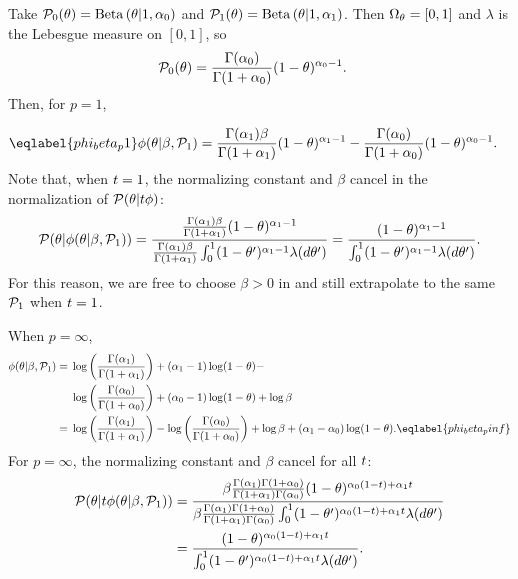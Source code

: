 \begin{ex}
%
Take $\mathcal{P}_{0}(\theta) = \mathrm{Beta}\left(\theta \vert 1, \alpha_0\right)$ and
$\mathcal{P}_{1}(\theta) = \mathrm{Beta}\left(\theta \vert 1, \alpha_1\right)$.  Then
$\Omega_{\theta}=[0,1]$ and $\lambda$ is the Lebesgue measure on $[0,1]$, so
%
\begin{align*}
%
\pbase(\theta) ={}&
    \frac{\Gamma(\alpha_0)}{\Gamma(1 + \alpha_0)} (1 - \theta)^{\alpha_0 - 1}.
%
\end{align*}
%
Then, for $p = 1$,

\begin{align}\eqlabel{phi_beta_p1}
%
\phi(\theta \vert \beta, \palt) ={}&
    \frac{\Gamma(\alpha_1)\beta}{\Gamma(1 + \alpha_1)} (1 - \theta)^{\alpha_1 - 1} -
    \frac{\Gamma(\alpha_0)}{\Gamma(1 + \alpha_0)}
        (1 - \theta)^{\alpha_0 - 1}.
%
\end{align}
%
Note that, when $t = 1$, the normalizing constant and $\beta$ cancel in the
normalization of $\mathcal{P}(\theta \vert t \phi)$:
%
\begin{align*}
%
\p(\theta \vert \phi(\theta \vert \beta, \palt)) =
\frac{\frac{\Gamma(\alpha_1)\beta}{\Gamma(1 + \alpha_1)} (1 - \theta)^{\alpha_1 - 1}}
     {\frac{\Gamma(\alpha_1)\beta}{\Gamma(1 + \alpha_1)}
       \int_0^1 (1 - \theta')^{\alpha_1 - 1} \lambda(d\theta')}
=
\frac{(1 - \theta)^{\alpha_1 - 1}}
     {\int_0^1 (1 - \theta')^{\alpha_1 - 1} \lambda(d\theta')}.
%
\end{align*}
%
For this reason, we are free to choose $\beta > 0$ in 
and still extrapolate to the same $\mathcal{P}_{1}$ when $t = 1$.

When $p = \infty$,
%
\begin{align}
%
\phi(\theta \vert \beta, \palt) ={}&
    \log \left(
        \frac{\Gamma(\alpha_1) }{\Gamma(1 + \alpha_1)}
    \right)  + (\alpha_1 - 1) \log (1 - \theta) - \nonumber\\
{}&
    \log \left(
        \frac{\Gamma(\alpha_0)}{\Gamma(1 + \alpha_0)}
    \right) + (\alpha_0 - 1) \log (1 - \theta)  + \log \beta \nonumber\\
={}&
\log \left(
    \frac{\Gamma(\alpha_1) }{\Gamma(1 + \alpha_1)}
\right) -
\log \left(
    \frac{\Gamma(\alpha_0)}{\Gamma(1 + \alpha_0)}
\right) + \log \beta + (\alpha_1 - \alpha_0) \log(1 - \theta).
\eqlabel{phi_beta_pinf}
%
\end{align}
%
For $p = \infty$, the normalizing constant and $\beta$ cancel for all $t$:
%
\begin{align*}
%
\p(\theta \vert \t \phi(\theta \vert \beta, \palt)) ={}&
\frac{  \beta \frac{\Gamma(\alpha_1) \Gamma(1 + \alpha_0) }
                   {\Gamma(1 + \alpha_1) \Gamma(\alpha_0)}
        (1-\theta)^{\alpha_0 (1 - \t) + \alpha_1 \t}
    }
    {
        \beta \frac{\Gamma(\alpha_1) \Gamma(1 + \alpha_0) }
                   {\Gamma(1 + \alpha_1) \Gamma(\alpha_0)}
             \int_0^1 (1-\theta')^{\alpha_0 (1 - \t) +
                                   \alpha_1 \t} \lambda(d\theta')
     }
\\={}&
\frac{(1-\theta)^{\alpha_0 (1 - \t) + \alpha_1 \t}}
     {\int_0^1 (1-\theta')^{\alpha_0 (1 - \t) + \alpha_1 \t} \lambda(d\theta')}.
%
\end{align*}
%
\end{ex}


